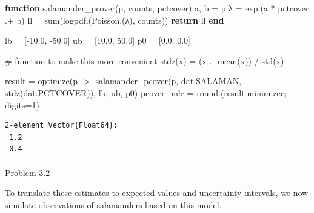 \documentclass[
  letterpaper,
  DIV=11,
  numbers=noendperiod]{scrartcl}
\makeatletter
\let\oldparagraph\paragraph
\renewcommand{\paragraph}{
    \@ifstar
      \xxxParagraphStar
      \xxxParagraphNoStar
  }
\newcommand{\xxxParagraphStar}[1]{\oldparagraph*{#1}\mbox{}}
\newcommand{\xxxParagraphNoStar}[1]{\oldparagraph{#1}\mbox{}}
\newenvironment{Shaded}{\begin{snugshade}}{\end{snugshade}}
\newcommand{\CommentTok}[1]{\textcolor[rgb]{0.37,0.37,0.37}{#1}}
\newcommand{\ControlFlowTok}[1]{\textcolor[rgb]{0.00,0.23,0.31}{\textbf{#1}}}
\newcommand{\FloatTok}[1]{\textcolor[rgb]{0.68,0.00,0.00}{#1}}
\newcommand{\FunctionTok}[1]{\textcolor[rgb]{0.28,0.35,0.67}{#1}}
\newcommand{\KeywordTok}[1]{\textcolor[rgb]{0.00,0.23,0.31}{\textbf{#1}}}
\newcommand{\NormalTok}[1]{\textcolor[rgb]{0.00,0.23,0.31}{#1}}
\newcommand{\OperatorTok}[1]{\textcolor[rgb]{0.37,0.37,0.37}{#1}}
\newcommand*\circled[1]{\tikz[baseline=(char.base)]{
          \node[shape=circle,draw,inner sep=1pt] (char) {{\scriptsize#1}};}}
\makeatother
\begin{document}
\label{annotated-cell-21}%
\begin{Shaded}
\begin{Highlighting}[]
\KeywordTok{function} \FunctionTok{salamander\_pcover}\NormalTok{(p, counts, pctcover) }
\NormalTok{    a, b }\OperatorTok{=}\NormalTok{ p}
\NormalTok{    λ }\OperatorTok{=} \FunctionTok{exp}\NormalTok{.(a }\OperatorTok{*}\NormalTok{ pctcover }\OperatorTok{.+}\NormalTok{ b)}
\NormalTok{    ll }\OperatorTok{=} \FunctionTok{sum}\NormalTok{(}\FunctionTok{logpdf}\NormalTok{.(}\FunctionTok{Poisson}\NormalTok{.(λ), counts))}
    \ControlFlowTok{return}\NormalTok{ ll}
\KeywordTok{end}

\NormalTok{lb }\OperatorTok{=}\NormalTok{ [}\OperatorTok{{-}}\FloatTok{10.0}\NormalTok{, }\OperatorTok{{-}}\FloatTok{50.0}\NormalTok{]}
\NormalTok{ub }\OperatorTok{=}\NormalTok{ [}\FloatTok{10.0}\NormalTok{, }\FloatTok{50.0}\NormalTok{]}
\NormalTok{p0 }\OperatorTok{=}\NormalTok{ [}\FloatTok{0.0}\NormalTok{, }\FloatTok{0.0}\NormalTok{]}

\CommentTok{\# function to make this more convenient}
\FunctionTok{stdz}\NormalTok{(x) }\OperatorTok{=}\NormalTok{ (x }\OperatorTok{.{-}} \FunctionTok{mean}\NormalTok{(x)) }\OperatorTok{/} \FunctionTok{std}\NormalTok{(x) }\hspace*{\fill}\NormalTok{\circled{1}}

\NormalTok{result }\OperatorTok{=} \FunctionTok{optimize}\NormalTok{(p }\OperatorTok{{-}\textgreater{}} \FunctionTok{{-}salamander\_pcover}\NormalTok{(p, dat.SALAMAN, }\FunctionTok{stdz}\NormalTok{(dat.PCTCOVER)), lb, ub, p0)}
\NormalTok{pcover\_mle }\OperatorTok{=} \FunctionTok{round}\NormalTok{.(result.minimizer; digits}\OperatorTok{=}\FloatTok{1}\NormalTok{)}
\end{Highlighting}
\end{Shaded}

\begin{verbatim}
2-element Vector{Float64}:
 1.2
 0.4
\end{verbatim}

\paragraph{Problem 3.2}\label{problem-3.2}

To translate these estimates to expected values and uncertainty
intervals, we now simulate observations of salamanders based on this
model.
\end{document}
